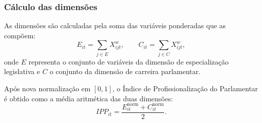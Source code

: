 \subsubsection*{Cálculo das dimensões}

As dimensões são calculadas pela soma das variáveis ponderadas que as compõem:
\[
E_{it} = \sum_{j \in E} X_{ijt}^{w}, 
\qquad 
C_{it} = \sum_{j \in C} X_{ijt}^{w},
\]
onde \(E\) representa o conjunto de variáveis da dimensão de especialização legislativa e \(C\) o conjunto da dimensão de carreira parlamentar.

Após nova normalização em \([0,1]\), o Índice de Profissionalização do Parlamentar é obtido como a média aritmética das duas dimensões:
\[
IPP_{it} = \frac{E_{it}^{\mathrm{norm}} + C_{it}^{\mathrm{norm}}}{2}.
\]


